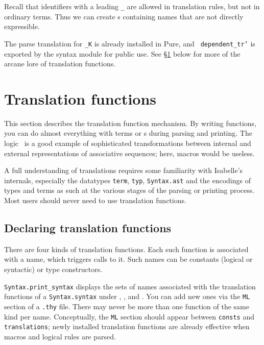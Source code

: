 Recall that identifiers with a leading {\tt _} are allowed in translation
rules, but not in ordinary terms.  Thus we can create \AST{}s containing
names that are not directly expressible.

The parse translation for {\tt _K} is already installed in Pure, and {\tt
dependent_tr'} is exported by the syntax module for public use.  See
\S\ref{sec:tr_funs} below for more of the arcane lore of translation functions.


\section{Translation functions} \label{sec:tr_funs}
%
This section describes the translation function mechanism.  By writing
\ML{} functions, you can do almost everything with terms or \AST{}s during
parsing and printing.  The logic \LK\ is a good example of sophisticated
transformations between internal and external representations of
associative sequences; here, macros would be useless.

A full understanding of translations requires some familiarity
with Isabelle's internals, especially the datatypes {\tt term}, {\tt typ},
{\tt Syntax.ast} and the encodings of types and terms as such at the various
stages of the parsing or printing process.  Most users should never need to
use translation functions.

\subsection{Declaring translation functions}
There are four kinds of translation functions.  Each such function is
associated with a name, which triggers calls to it.  Such names can be
constants (logical or syntactic) or type constructors.

{\tt Syntax.print_syntax} displays the sets of names associated with the
translation functions of a {\tt Syntax.syntax} under
, ,
 and .  You can
add new ones via the {\tt ML} section of
a {\tt .thy} file.  There may never be more than one function of the same
kind per name.  Conceptually, the {\tt ML} section should appear between
{\tt consts} and {\tt translations}; newly installed translation functions
are already effective when macros and logical rules are parsed.

